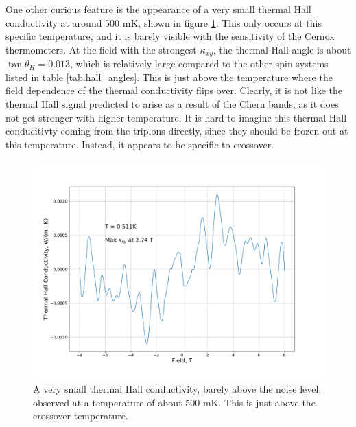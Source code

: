\documentclass{thesis-umich}
\begin{document}
One other curious feature is the appearance of a very small thermal Hall conductivity at around 500 mK, shown in figure \ref{fig:SCBO_small_thall}. This only occurs at this specific temperature, and it is barely visible with the sensitivity of the Cernox thermometers. At the field with the strongest $\kappa_{xy}$, the thermal Hall angle is about $\tan \theta_H = 0.013$, which is relatively large compared to the other spin systems listed in table \ref{tab:hall_angles}. This is just above the temperature where the field dependence of the thermal conductivity flips over. Clearly, it is not like the thermal Hall signal predicted to arise as a result of the Chern bands, as it does not get stronger with higher temperature. It is hard to imagine this thermal Hall conducitivty coming from the triplons directly, since they should be frozen out at this temperature. Instead, it appears to be specific to crossover. 

\begin{figure}
	\centering
	\caption[Small thermal Hall conductivity in SCBO]{A very small thermal Hall conductivity, barely above the noise level, observed at a temperature of about 500 mK. This is just above the crossover temperature.}
	\label{fig:SCBO_small_thall}
	\includegraphics[width=\columnwidth]{figures/SCBO_kappa_xy_vs_B.pdf}
\end{figure}
\end{document}
